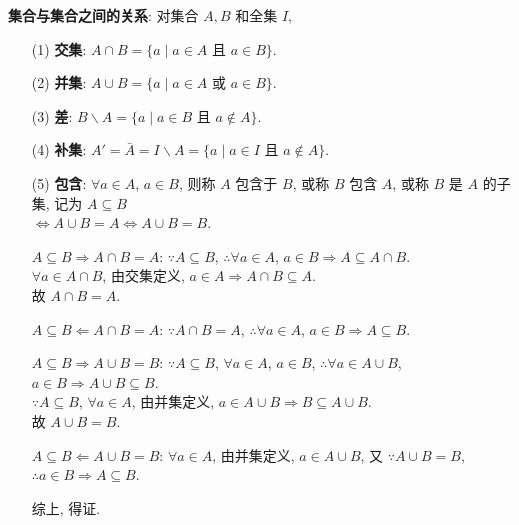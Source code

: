 \documentclass{note}
\begin{document}
\textbf{集合与集合之间的关系}: 对集合 $A,B$ 和全集 $I$,
\begin{itemize}
    \item[(1)] \textbf{交集}: $A\cap B=\{a\mid a\in A\text{ 且 }a\in B\}$.
    \item[(2)] \textbf{并集}: $A\cup B=\{a\mid a\in A\text{ 或 }a\in B\}$.
    \item[(3)] \textbf{差}: $B\backslash A=\{a\mid a\in B\text{ 且 }a\notin A\}$.
    \item[(4)] \textbf{补集}: $A'=\bar{A}=I\backslash A=\{a\mid a\in I\text{ 且 }a\notin A\}$.
    \item[(5)] \textbf{包含}: $\forall a\in A$, $a\in B$, 则称 $A$ 包含于 $B$, 或称 $B$ 包含 $A$, 或称 $B$ 是 $A$ 的子集, 记为 $A\subseteq B$\\
    $\Longleftrightarrow A\cup B=A\Longleftrightarrow A\cup B=B$.
    \begin{pf}
        \uline{$A\subseteq B\Longrightarrow A\cap B=A$}: $\because A\subseteq B$, $\therefore\forall a\in A$, $a\in B\Longrightarrow A\subseteq A\cap B$.\\
        $\forall a\in A\cap B$, 由交集定义, $a\in A\Longrightarrow A\cap B\subseteq A$.\\
        故 $A\cap B=A$.

        \uline{$A\subseteq B\Longleftarrow A\cap B=A$}: $\because A\cap B=A$, $\therefore\forall a\in A$, $a\in B\Longrightarrow A\subseteq B$.

        \uline{$A\subseteq B\Longrightarrow A\cup B=B$}: $\because A\subseteq B$, $\forall a\in A$, $a\in B$, $\therefore\forall a\in A\cup B$, $a\in B\Longrightarrow A\cup B\subseteq B$.\\
        $\because A\subseteq B$, $\forall a\in A$, 由并集定义, $a\in A\cup B\Longrightarrow B\subseteq A\cup B$.\\
        故 $A\cup B=B$.

        \uline{$A\subseteq B\Longleftarrow A\cup B=B$}: $\forall a\in A$, 由并集定义, $a\in A\cup B$, 又 $\because A\cup B=B$, $\therefore a\in B\Longrightarrow A\subseteq B$.

        综上, 得证.
    \end{pf}
\end{itemize}
\end{document}
